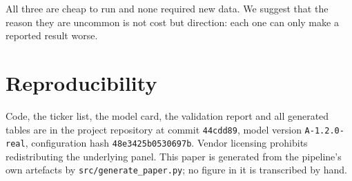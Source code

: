 \documentclass[conference]{IEEEtran}
\begin{document}
All three are cheap to run and none required new data. We suggest that the
reason they are uncommon is not cost but direction: each one can only make a
reported result worse.

\section*{Reproducibility}
Code, the ticker list, the model card, the validation report and all generated
tables are in the project repository at commit \texttt{44cdd89}, model version
\texttt{A-1.2.0-real}, configuration hash
\texttt{48e3425b0530697b}. Vendor licensing prohibits redistributing the
underlying panel. This paper is generated from the pipeline's own artefacts by
\texttt{src/generate\_paper.py}; no figure in it is transcribed by hand.
\end{document}
